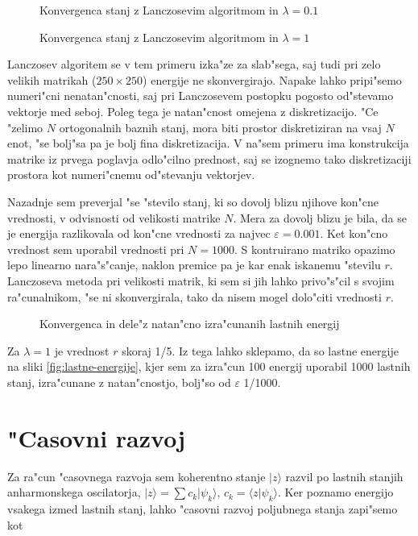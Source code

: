 \documentclass[a4paper,10pt]{article}
\begin{document}
\begin{figure}[H]
\centering

\caption{Konvergenca stanj z Lanczosevim algoritmom in $\lambda=0.1$}
\end{figure}

\begin{figure}[H]
\centering

\caption{Konvergenca stanj z Lanczosevim algoritmom in $\lambda=1$}
\end{figure}

Lanczosev algoritem se v tem primeru izka"ze za slab"sega, saj tudi pri zelo velikih matrikah ($250\times 250$) energije ne skonvergirajo. Napake lahko pripi"semo numeri"cni nenatan"cnosti, saj pri Lanczosevem postopku pogosto od"stevamo vektorje med seboj. Poleg tega je natan"cnost omejena z diskretizacijo. "Ce "zelimo $N$ ortogonalnih baznih stanj, mora biti prostor diskretiziran na vsaj $N$ enot, "se bolj"sa pa je bolj fina diskretizacija. V na"sem primeru ima konstrukcija matrike iz prvega poglavja odlo"cilno prednost, saj se izognemo tako diskretizaciji prostora kot numeri"cnemu od"stevanju vektorjev. 

Nazadnje sem preverjal "se "stevilo stanj, ki so dovolj blizu njihove kon"cne vrednosti, v odvisnosti od velikosti matrike $N$. Mera za dovolj blizu je bila, da se je energija razlikovala od kon"cne vrednosti za najvec $\varepsilon = 0.001$. Ket kon"cno vrednost sem uporabil vrednosti pri $N=1000$. S kontruirano matriko opazimo lepo linearno nara"s"canje, naklon premice pa je kar enak iskanemu "stevilu $r$. Lanczoseva metoda pri velikosti matrik, ki sem si jih lahko privo"s"cil s svojim ra"cunalnikom, "se ni skonvergirala, tako da nisem mogel dolo"citi vrednosti $r$. 

\begin{figure}
\centering
 
 \caption{Konvergenca in dele"z natan"cno izra"cunanih lastnih energij}
 \label{fig:konvergenca}
\end{figure}

Za $\lambda=1$ je vrednost $r$ skoraj 1/5. Iz tega lahko sklepamo, da so lastne energije na sliki \ref{fig:lastne-energije}, kjer sem za izra"cun 100 energij uporabil 1000 lastnih stanj, izra"cunane z natan"cnostjo, bolj"so od $\varepsilon$ 1/1000. 

\section{"Casovni razvoj}

Za ra"cun "casovnega razvoja sem koherentno stanje $|z\rangle$ razvil po lastnih stanjih anharmonskega oscilatorja, $|z\rangle = \sum c_k |\psi_k\rangle$, $c_k = \langle z|\psi_k\rangle$. Ker poznamo energijo vsakega izmed lastnih stanj, lahko "casovni razvoj poljubnega stanja zapi"semo kot
\end{document}
